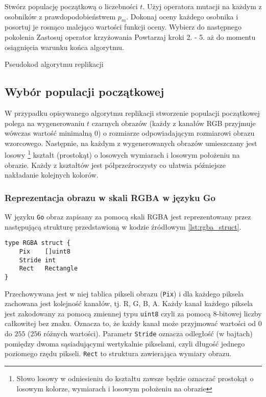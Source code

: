 \begin{algorithm}
    \begin{algorithmic}[1]
        \State Stwórz populację początkową o liczebności $t$.
        \State Użyj operatora mutacji na każdym z osobników z prawdopodobieństwem $p_{m}$.
        \State Dokonaj oceny każdego osobnika i posortuj je rosnąco malejąco wartości funkcji oceny.
        \State Wybierz do następnego pokolenia
        \State Zastosuj operator krzyżowania
        \State Powtarzaj kroki 2. - 5. aż do momentu osiągnięcia warunku końca algorytmu.
    \end{algorithmic}
    \caption{Pseudokod algorytmu replikacji}
    \label{lst:pseudocode}
\end{algorithm}


\subsection{Wybór populacji początkowej}
W przypadku opisywanego algorytmu replikacji stworzenie populacji początkowej polega na wygenerowaniu $t$ czarnych obrazów (każdy z kanałów RGB przyjmuje wówczas wartość minimalną $0$) o rozmiarze odpowiadającym rozmiarowi obrazu wzorcowego. Następnie, na każdym z wygenerowanych obrazów umieszczany jest losowy \footnote{Słowo losowy w odniesieniu do kształtu zawsze będzie oznaczać prostokąt o losowym kolorze, wymiarach i losowym położeniu na obrazie} kształt (prostokąt) o losowych wymiarach i losowym położeniu na obrazie. Każdy z kształtów jest półprzeźroczysty co ułatwia późniejsze nakładanie kolejnych kolorów.

\subsubsection{Reprezentacja obrazu w skali RGBA w języku Go}

W języku \texttt{Go} obraz zapisany za pomocą skali RGBA jest reprezentowany przez następującą strukturę przedstawioną w kodzie źródłowym \ref{lst:rgba_struct}.
\begin{lstlisting}[caption={Struktura reprezentująca obraz w skali RGBA w języku \texttt{GO}}, captionpos=b, label={lst:rgba_struct}]
type RGBA struct {
    Pix    []uint8
    Stride int
    Rect   Rectangle
}
\end{lstlisting}
Przechowywana jest w niej tablica pikseli obrazu (\texttt{Pix}) i dla każdego piksela zachowana jest kolejność kanałów, tj. R, G, B, A. Każdy kanał każdego piksela jest zakodowany za pomocą zmiennej typu \texttt{uint8} czyli za pomocą 8-bitowej liczby całkowitej bez znaku. Oznacza to, że każdy kanał może przyjmować wartości od $0$ do $255$ ($256$ różnych wartości). Parametr \texttt{Stride} oznacza odległość  (w bajtach) pomiędzy dwoma sąsiadującymi wertykalnie pikselami, czyli długość jednego poziomego rzędu pikseli. \texttt{Rect} to struktura zawierająca wymiary obrazu.

